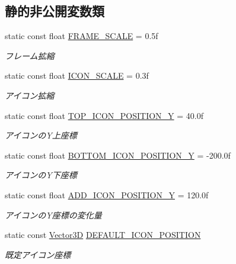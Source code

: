 \subsection*{静的非公開変数類}
\begin{DoxyCompactItemize}
\item 
static const float \mbox{\hyperlink{class_pause_a1dd4a58b423386d95a848a52d9fb6ef2}{F\+R\+A\+M\+E\+\_\+\+S\+C\+A\+LE}} = 0.\+5f
\begin{DoxyCompactList}\small\item\em フレーム拡縮 \end{DoxyCompactList}\item 
static const float \mbox{\hyperlink{class_pause_a707447ebd78ae48e3d52bf226f0c8324}{I\+C\+O\+N\+\_\+\+S\+C\+A\+LE}} = 0.\+3f
\begin{DoxyCompactList}\small\item\em アイコン拡縮 \end{DoxyCompactList}\item 
static const float \mbox{\hyperlink{class_pause_aec0b6c71ab048313f574dfdb50b95f3b}{T\+O\+P\+\_\+\+I\+C\+O\+N\+\_\+\+P\+O\+S\+I\+T\+I\+O\+N\+\_\+Y}} = 40.\+0f
\begin{DoxyCompactList}\small\item\em アイコンの\+Y上座標 \end{DoxyCompactList}\item 
static const float \mbox{\hyperlink{class_pause_afe41dc7ec4e232145031759d84bbf1c1}{B\+O\+T\+T\+O\+M\+\_\+\+I\+C\+O\+N\+\_\+\+P\+O\+S\+I\+T\+I\+O\+N\+\_\+Y}} = -\/200.\+0f
\begin{DoxyCompactList}\small\item\em アイコンの\+Y下座標 \end{DoxyCompactList}\item 
static const float \mbox{\hyperlink{class_pause_a9a4d0e76c041957420854824cb1bc042}{A\+D\+D\+\_\+\+I\+C\+O\+N\+\_\+\+P\+O\+S\+I\+T\+I\+O\+N\+\_\+Y}} = 120.\+0f
\begin{DoxyCompactList}\small\item\em アイコンの\+Y座標の変化量 \end{DoxyCompactList}\item 
static const \mbox{\hyperlink{class_vector3_d}{Vector3D}} \mbox{\hyperlink{class_pause_a1dd0b606e517fcc6bb8efe230d0c897d}{D\+E\+F\+A\+U\+L\+T\+\_\+\+I\+C\+O\+N\+\_\+\+P\+O\+S\+I\+T\+I\+ON}}
\begin{DoxyCompactList}\small\item\em 既定アイコン座標 \end{DoxyCompactList}\item 

\end{DoxyCompactItemize}
